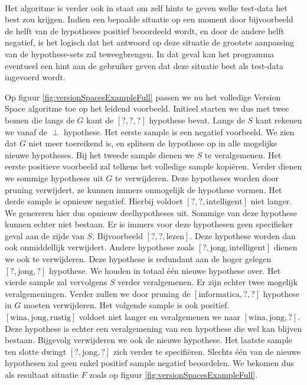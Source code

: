 \paragraph{}
Het algoritme is verder ook in staat om zelf hints te geven welke test-data het best zou krijgen. Indien een bepaalde situatie op een moment door bijvoorbeeld de helft van de hypotheses positief beoordeeld wordt, en door de andere helft negatief, is het logisch dat het antwoord op deze situatie de grootste aanpassing van de hypothese-sets zal teweegbrengen. In dat geval kan het programma eventueel een hint aan de gebruiker geven dat deze situatie best als test-data ingevoerd wordt.
\begin{leftbar}
Op figuur \ref{fig:versionSpacesExampleFull} passen we nu het volledige Version Space algoritme toe op het leidend voorbeeld. Initieel starten we dus met twee bomen die langs de $G$ kant de $\left[?,?,?\right]$ hypothese bevat. Langs de $S$ kant rekenen we vanaf de $\perp$ hypothese. Het eerste sample is een negatief voorbeeld. We zien dat $G$ niet meer toereikend is, en splitsen de hypothese op in alle mogelijke nieuwe hypotheses. Bij het tweede sample dienen we $S$ te veralgemenen. Het eerste positieve voorbeeld zal telkens het volledige sample kopi\"eren. Verder dienen we sommige hypotheses uit $G$ te verwijderen. Deze hypotheses worden door pruning verwijdert, ze kunnen immers onmogelijk de hypothese vormen. Het derde sample is opnieuw negatief. Hierbij voldoet $\left[?,?,\mbox{intelligent}\right]$ niet langer. We genereren hier dus opnieuw deelhypotheses uit. Sommige van deze hypothese kunnen echter niet bestaan. Er is immers voor deze hypothesen geen specifieker geval aan de zijde van $S$. Bijvoorbeeld $\left[?,?,\mbox{lezen}\right]$. Deze hypothese worden dan ook onmiddellijk verwijdert. Andere hypothese zoals $\left[?,\mbox{jong},\mbox{intelligent}\right]$ dienen we ook te verwijderen. Deze hypothese is redundant aan de hoger gelegen $\left[?,\mbox{jong},?\right]$ hypothese. We houden in totaal \'e\'en nieuwe hypothese over. Het vierde sample zal vervolgens $S$ verder veralgemenen. Er zijn echter twee mogelijk veralgemeningen. Verder zullen we door pruning de $\left[\mbox{informatica},?,?\right]$ hypothese in $G$ moeten verwijderen. Het volgende sample is ook positief. $\left[\mbox{wina},\mbox{jong},\mbox{rustig}\right]$ voldoet niet langer en veralgemenen we naar $\left[\mbox{wina},\mbox{jong},?\right]$. Deze hypothese is echter een veralgemening van een hypothese die wel kan blijven bestaan. Bijgevolg verwijderen we ook de nieuwe hypothese. Het laatste sample ten slotte dwingt $\left[?,\mbox{jong},?\right]$ zich verder te specifi\"eren. Slechts \'e\'en van de nieuwe hypothesen zal geen enkel positief sample negatief beoordelen. We bekomen dus als resultaat situatie $F$ zoals op figuur \ref{fig:versionSpacesExampleFull}.
\end{leftbar}
